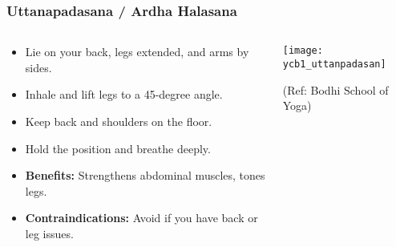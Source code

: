 \begin{frame}[fragile]\frametitle{Uttanapadasana / Ardha Halasana}
\begin{columns}
    \begin{column}[T]{0.5\linewidth}
      \begin{itemize}
        \item Lie on your back, legs extended, and arms by sides.
        \item Inhale and lift legs to a 45-degree angle.
        \item Keep back and shoulders on the floor.
        \item Hold the position and breathe deeply.
        \item \textbf{Benefits:} Strengthens abdominal muscles, tones legs.
        \item \textbf{Contraindications:} Avoid if you have back or leg issues.
      \end{itemize}
    \end{column}
    \begin{column}[T]{0.5\linewidth}
        \begin{center}
        \begin{center}
		        \texttt{[image: ycb1\_uttanpadasan]}
				
				{\tiny (Ref: Bodhi School of Yoga)}	        
		\end{center}   
        \end{center}    
    \end{column}
  \end{columns}
\end{frame}

				
